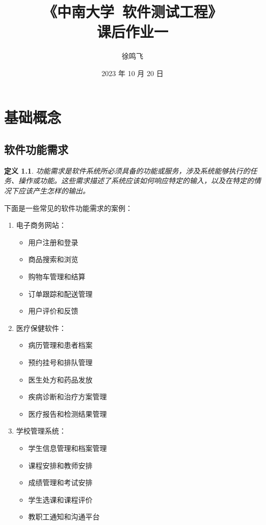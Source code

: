 \documentclass[11pt, a4paper, oneside]{ctexbook}
\title{{\Huge{\textbf{《中南大学\ 软件测试工程》}}}\\课后作业一}
\author{徐鸣飞}
\date{2023 年 10 月 20 日}
\newtheorem{definition}[theorem]{定义}
\begin{document}
\maketitle
{}
\setcounter{page}{1}
\newpage
{}
\setcounter{page}{1}
\tableofcontents
\newpage
\setcounter{page}{1}

\chapter{基础概念}
\section{软件功能需求}
\begin{definition}
    功能需求是软件系统所必须具备的功能或服务，涉及系统能够执行的任务、操作或功能。这些需求描述了系统应该如何响应特定的输入，以及在特定的情况下应该产生怎样的输出。
\end{definition}
下面是一些常见的软件功能需求的案例：
\begin{enumerate}[itemsep=10pt,parsep=0pt,partopsep=0pt,topsep=0pt]
    \item 电子商务网站：
    
    \begin{itemize}[itemsep=0pt,parsep=0pt,partopsep=0pt,topsep=0pt]
        \item 用户注册和登录
        \item 商品搜索和浏览
        \item 购物车管理和结算
        \item 订单跟踪和配送管理
        \item 用户评价和反馈
    \end{itemize}
    \item 医疗保健软件：
    
    \begin{itemize}[itemsep=0pt,parsep=0pt,partopsep=0pt,topsep=0pt]
        \item 病历管理和患者档案
        \item 预约挂号和排队管理
        \item 医生处方和药品发放
        \item 疾病诊断和治疗方案管理
        \item 医疗报告和检测结果管理
    \end{itemize}
    \item 学校管理系统：
    
    \begin{itemize}[itemsep=0pt,parsep=0pt,partopsep=0pt,topsep=0pt]
        \item 学生信息管理和档案管理
        \item 课程安排和教师安排
        \item 成绩管理和考试安排
        \item 学生选课和课程评价
        \item 教职工通知和沟通平台
    \end{itemize}
\end{enumerate}
\end{document}
